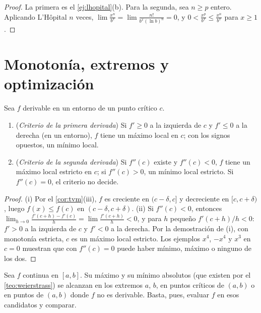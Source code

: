 \begin{proof}
La primera es el \cref{ej:lhopital}(b). Para la segunda, sea $n\ge p$ entero. Aplicando L'Hôpital $n$ veces, $\lim\frac{x^{n}}{b^{x}}=\lim\frac{n!}{b^{x}(\ln b)^{n}}=0$, y $0<\frac{x^{p}}{b^{x}}\le\frac{x^{n}}{b^{x}}$ para $x\ge1$.
\end{proof}

\section{Monotonía, extremos y optimización}

\begin{proposicion}\label{prop:criterios}
Sea $f$ derivable en un entorno de un punto crítico $c$.
\begin{enumerate}
  \item (\emph{Criterio de la primera derivada}) Si $f'\ge0$ a la izquierda de $c$ y $f'\le0$ a la derecha (en un entorno), $f$ tiene un máximo local en $c$; con los signos opuestos, un mínimo local.
  \item (\emph{Criterio de la segunda derivada}) Si $f''(c)$ existe y $f''(c)<0$, $f$ tiene un máximo local estricto en $c$; si $f''(c)>0$, un mínimo local estricto. Si $f''(c)=0$, el criterio no decide.
\end{enumerate}
\end{proposicion}

\begin{proof}
(i) Por el \cref{cor:tvm}(iii), $f$ es creciente en $(c-\delta,c]$ y decreciente en $[c,c+\delta)$, luego $f(x)\le f(c)$ en $(c-\delta,c+\delta)$. (ii) Si $f''(c)<0$, entonces $\lim_{h\to0}\frac{f'(c+h)-f'(c)}{h}=\lim\frac{f'(c+h)}{h}<0$, y para $h$ pequeño $f'(c+h)/h<0$: $f'>0$ a la izquierda de $c$ y $f'<0$ a la derecha. Por la demostración de (i), con monotonía estricta, $c$ es un máximo local estricto. Los ejemplos $x^{4}$, $-x^{4}$ y $x^{3}$ en $c=0$ muestran que con $f''(c)=0$ puede haber mínimo, máximo o ninguno de los dos.
\end{proof}

\begin{proposicion}\label{prop:intervalo-cerrado}
Sea $f$ continua en $[a,b]$. Su máximo y su mínimo absolutos (que existen por el \cref{teo:weierstrass}) se alcanzan en los extremos $a$, $b$, en puntos críticos de $(a,b)$ o en puntos de $(a,b)$ donde $f$ no es derivable. Basta, pues, evaluar $f$ en esos candidatos y comparar.
\end{proposicion}


